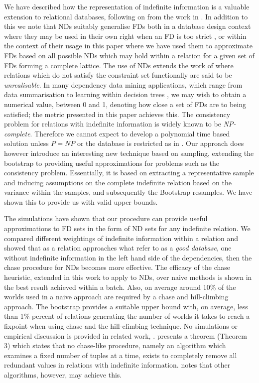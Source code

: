 We have described how the representation of indefinite information is a 
valuable extension to relational databases, following on from the work
in \cite{inv91,vn95}. In addition to this we 
note that NDs suitably generalise FDs
both in a database design context where they may be used in their
own right when an FD is too strict \cite{gm85b}, or within the context of their
usage in this paper where we have used them to approximate FDs based
on all possible NDs which may hold within a relation for a given set of FDs forming a complete lattice.  The use of NDs extends the work of \cite{vn95}
where relations which do not satisfy the constraint set functionally are
said to be {\em unrealisable}. In many dependency data mining applications,
which range from data summarisation to learning within decision trees \cite{psm93}, we may wish to obtain a numerical value, between 0 and 1, denoting how close a set of 
FDs are to being satisfied; the metric presented in this paper achieves
this. 
The consistency problem for relations with indefinite information is
widely known to be {\em NP-complete}. Therefore we cannot expect to
develop a polynomial time based solution unless $P = NP$ or the database is
restricted as in \cite{vn95}. Our approach
does however introduce an interesting new technique based on sampling,
extending the bootstrap to providing useful approximations for
problems such as the consistency problem. Essentially, it is based on
extracting a representative sample and inducing assumptions on the 
complete indefinite relation based on the variance within the samples, and
subsequently the Bootstrap resamples. We have shown this to provide us
with valid upper bounds.

\medskip

The simulations have shown that our procedure can provide useful
approximations to FD sets in the form of ND sets for any indefinite
relation. We compared different weightings of indefinite information within
a relation and showed that as a relation approaches what \cite{vn95}
refer to as a {\em good database}, one without indefinite information
in the left hand side of the dependencies, then the chase procedure for
NDs becomes more effective. The efficacy of the chase heuristic, extended in
this work to apply to NDs, over naive methods is shown in the
best result achieved within a batch. Also, on average around 10\% of 
the worlds used in 
a naive approach are required by a chase and hill-climbing approach.
The bootstrap provides a suitable upper bound with, on average, 
less than 1\% percent of relations generating the number of worlds it
takes to reach a fixpoint when using chase and the hill-climbing technique.
No simulations or empirical discussion is provided in related work,
\cite{vn95,inv91}. \cite{imi91} presents a theorem (Theorem 3) which
states that no chase-like procedure, namely an algorithm which
examines a fixed number of tuples at a time, exists to completely
remove all redundant values in relations with indefinite
information. \cite{vn95} notes that other algorithms, however, may
achieve this.

